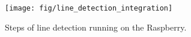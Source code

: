 \begin{figure}[ht!]
\begin{center}
\texttt{[image: fig/line\_detection\_integration]}\\
\caption{Steps of line detection running on the Raspberry.}
\label{fig_line_detection_integration}
\end{center}
\end{figure}
